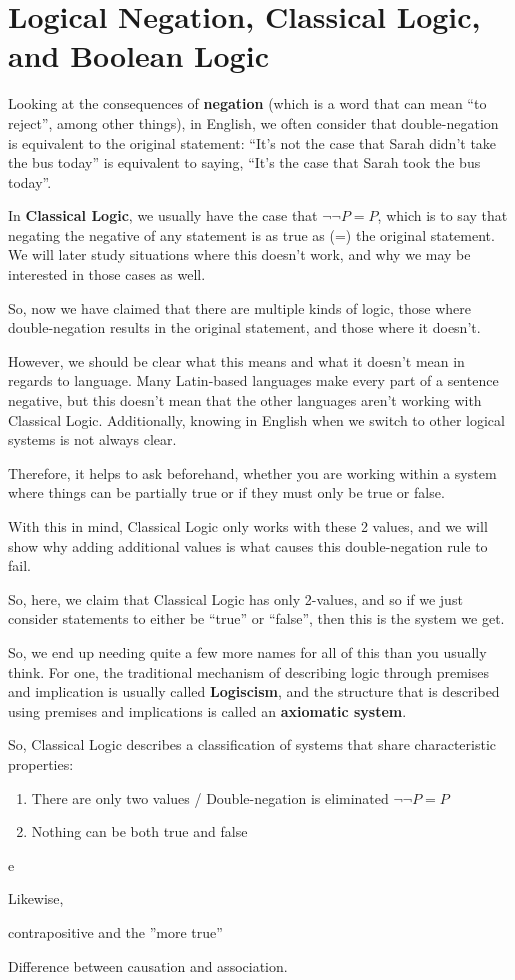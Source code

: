 \section{Logical Negation, Classical Logic, and Boolean Logic}

Looking at the consequences of \textbf{negation} (which is a word that can mean ``to reject'', among other things), in English, we often consider that double-negation is equivalent to the original statement: ``It's not the case that Sarah didn't take the bus today'' is equivalent to saying, ``It's the case that Sarah took the bus today''.

In \textbf{Classical Logic}, we usually have the case that $\neg \neg P = P$, which is to say that negating the negative of any statement is as true as (=) the original statement. We will later study situations where this doesn't work, and why we may be interested in those cases as well.

So, now we have claimed that there are multiple kinds of logic, those where double-negation results in the original statement, and those where it doesn't.

However, we should be clear what this means and what it doesn't mean in regards to language. Many Latin-based languages make every part of a sentence negative, but this doesn't mean that the other languages aren't working with Classical Logic. Additionally, knowing in English when we switch to other logical systems is not always clear.

Therefore, it helps to ask beforehand, whether you are working within a system where things can be partially true or if they must only be true or false.

With this in mind, Classical Logic only works with these 2 values, and we will show why adding additional values is what causes this double-negation rule to fail.

So, here, we claim that Classical Logic has only 2-values, and so if we just consider statements to either be ``true'' or ``false'', then this is the system we get.

So, we end up needing quite a few more names for all of this than you usually think. For one, the traditional mechanism of describing logic through premises and implication is usually called \textbf{Logiscism}, and the structure that is described using premises and implications is called an \textbf{axiomatic system}.

So, Classical Logic describes a classification of systems that share characteristic properties:

\begin{enumerate}
    \item There are only two values / Double-negation is eliminated $\neg \neg P = P$
    \item Nothing can be both true and false
\end{enumerate}

e



Likewise, 



contrapositive and the ''more true''



Difference between causation and association.